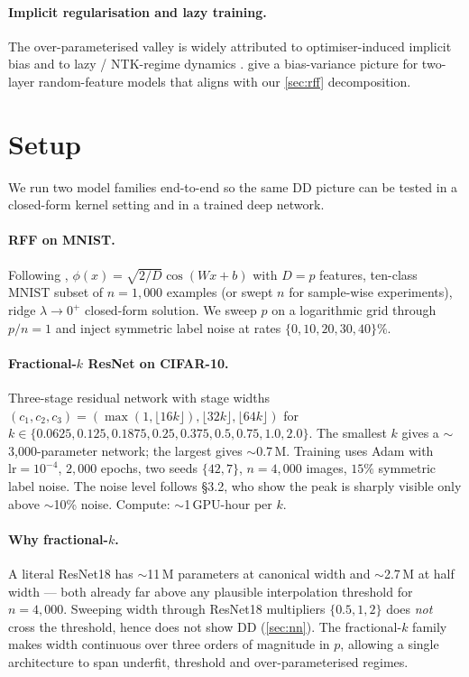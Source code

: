 \paragraph{Implicit regularisation and lazy training.} The over-parameterised valley is widely attributed to optimiser-induced implicit bias \citep{gunasekar2017implicit,ji2019implicit} and to lazy / NTK-regime dynamics \citep{chizat2018global,du2019gradient}. \citet{dascoli2020double} give a bias-variance picture for two-layer random-feature models that aligns with our \cref{sec:rff} decomposition.

\section{Setup}
\label{sec:setup}

We run two model families end-to-end so the same DD picture can be tested in a closed-form kernel setting and in a trained deep network.

\paragraph{RFF on MNIST.} Following \citet{rahimi2007random}, $\phi(x)=\sqrt{2/D}\cos(Wx+b)$ with $D=p$ features, ten-class MNIST subset of $n=1{,}000$ examples (or swept $n$ for sample-wise experiments), ridge $\lambda\to0^+$ closed-form solution. We sweep $p$ on a logarithmic grid through $p/n=1$ and inject symmetric label noise at rates $\{0,10,20,30,40\}\%$.

\paragraph{Fractional-$k$ ResNet on CIFAR-10.} Three-stage residual network with stage widths $(c_1,c_2,c_3)=(\max(1,\lfloor 16k\rfloor), \lfloor 32k\rfloor, \lfloor 64k\rfloor)$ for $k\in\{0.0625, 0.125, 0.1875, 0.25, 0.375, 0.5, 0.75, 1.0, 2.0\}$. The smallest $k$ gives a $\sim$3{,}000-parameter network; the largest gives $\sim$0.7\,M. Training uses Adam \citep{kingma2015adam} with $\mathrm{lr}=10^{-4}$, $2{,}000$ epochs, two seeds $\{42, 7\}$, $n=4{,}000$ images, $15\%$ symmetric label noise. The noise level follows \citet{belkin2019reconciling} \S3.2, who show the peak is sharply visible only above $\sim$10\% noise. Compute: $\sim$1\,GPU-hour per $k$.

\paragraph{Why fractional-$k$.} A literal ResNet18 has $\sim$11\,M parameters at canonical width and $\sim$2.7\,M at half width --- both already far above any plausible interpolation threshold for $n=4{,}000$. Sweeping width through ResNet18 multipliers $\{0.5, 1, 2\}$ does \emph{not} cross the threshold, hence does not show DD (\cref{sec:nn}). The fractional-$k$ family makes width continuous over three orders of magnitude in $p$, allowing a single architecture to span underfit, threshold and over-parameterised regimes.

